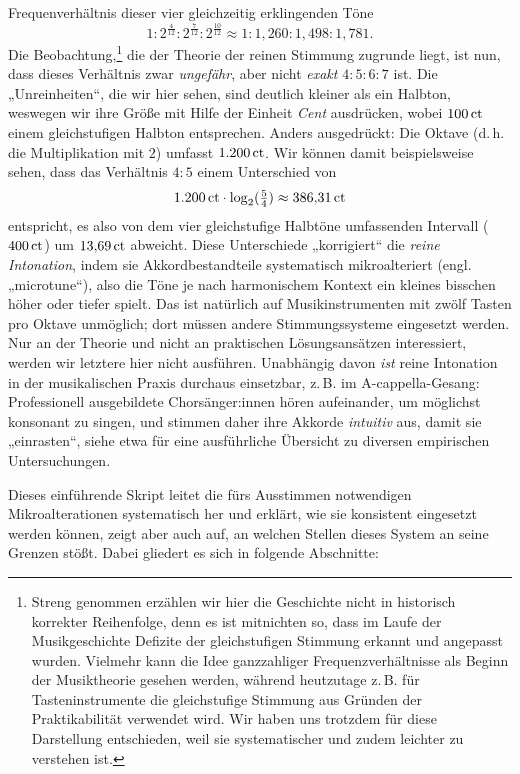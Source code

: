 Frequenverhältnis dieser vier gleichzeitig erklingenden Töne %
\[1:2^{\frac4{12}}:2^{\frac7{12}}:2^{\frac{10}{12}}\approx
  1:1{,}260:1{,}498:1{,}781.\]%
Die Beobachtung,\footnote{Streng genommen erzählen wir hier die Geschichte nicht
  in historisch korrekter Reihenfolge, denn es ist mitnichten so, dass im Laufe
  der Musikgeschichte Defizite der gleichstufigen Stimmung erkannt und angepasst
  wurden. Vielmehr kann die Idee ganzzahliger Frequenzverhältnisse als Beginn
  der Musiktheorie gesehen werden, während heutzutage z.\,B. für
  Tasteninstrumente die gleichstufige Stimmung aus Gründen der Praktikabilität
  verwendet wird. Wir haben uns trotzdem für diese Darstellung entschieden, weil
  sie systematischer und zudem leichter zu verstehen ist.} die der Theorie der
reinen Stimmung zugrunde liegt, ist nun, dass dieses Verhältnis zwar
\emph{ungefähr}, aber nicht \emph{exakt} $4:5:6:7$ ist. Die „Unreinheiten“, die
wir hier sehen, sind deutlich kleiner als ein Halbton, weswegen wir ihre
Größe mit Hilfe der Einheit \emph{Cent} ausdrücken, wobei $100\,\text{ct}$ einem
gleichstufigen Halbton entsprechen. Anders ausgedrückt: Die Oktave (d.\,h. die
Multiplikation mit $2$) umfasst $1{.}200\,\text{ct}$. Wir können damit
beispielsweise sehen, dass das Verhältnis $4:5$ einem Unterschied von
\[1{.}200\,\text{ct}\cdot \log_2(\tfrac54) \approx 386{,}31\,\text{ct}\]%
entspricht, es also von dem vier gleichstufige Halbtöne umfassenden Intervall
($400\,\text{ct}$) um $13{,}69\,\text{ct}$ abweicht. Diese Unterschiede „korrigiert“ die
\emph{reine Intonation}, indem sie Akkordbestandteile systematisch
mikroalteriert (engl. „microtune“), also die Töne je nach harmonischem Kontext
ein kleines bisschen höher oder tiefer spielt. Das ist natürlich auf
Musikinstrumenten mit zwölf Tasten pro Oktave unmöglich; dort müssen andere
Stimmungssysteme eingesetzt werden. Nur an der Theorie und nicht an praktischen
Lösungsansätzen interessiert, werden wir letztere hier nicht
ausführen. Unabhängig davon \emph{ist} reine Intonation in der musikalischen
Praxis durchaus einsetzbar, z.\,B. im A-cappella-Gesang: Professionell
ausgebildete Chorsänger:innen hören aufeinander, um möglichst konsonant zu
singen, und stimmen daher ihre Akkorde \emph{intuitiv} aus, damit sie
„einrasten“, siehe etwa \cite[§\,2.4]{Maria} für eine ausführliche Übersicht zu
diversen empirischen Untersuchungen.

Dieses einführende Skript leitet die fürs Ausstimmen notwendigen
Mikroalterationen systematisch her und erklärt, wie sie konsistent eingesetzt
werden können, zeigt aber auch auf, an welchen Stellen dieses System an seine
Grenzen stößt. Dabei gliedert es sich in folgende Abschnitte:


